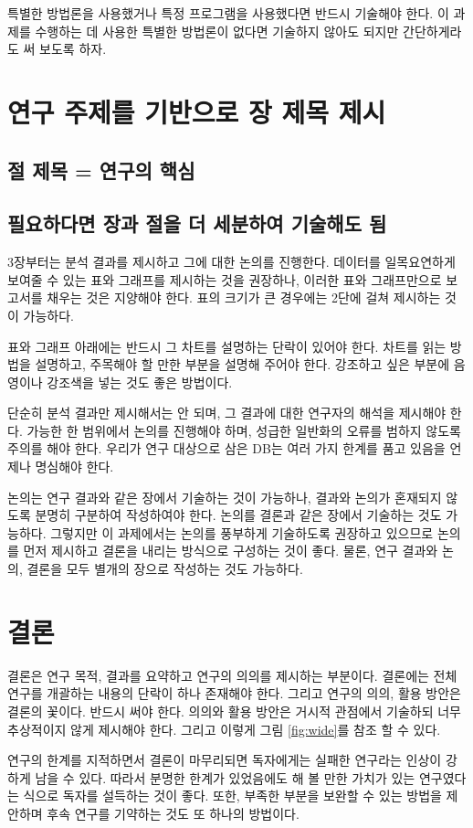 특별한 방법론을 사용했거나 특정 프로그램을 사용했다면 반드시 기술해야 한다. 이 과제를 수행하는 데 사용한 특별한 방법론이 없다면 기술하지 않아도 되지만 간단하게라도 써 보도록 하자.

\section{연구 주제를 기반으로 장 제목 제시}

\subsection{절 제목 = 연구의 핵심}

\subsection{필요하다면 장과 절을 더 세분하여 기술해도 됨}

3장부터는 분석 결과를 제시하고 그에 대한 논의를 진행한다. 데이터를 일목요연하게 보여줄 수 있는 표와 그래프를 제시하는 것을 권장하나, 이러한 표와 그래프만으로 보고서를 채우는 것은 지양해야 한다. 표의 크기가 큰 경우에는 2단에 걸쳐 제시하는 것이 가능하다. 

표와 그래프 아래에는 반드시 그 차트를 설명하는 단락이 있어야 한다. 차트를 읽는 방법을 설명하고, 주목해야 할 만한 부분을 설명해 주어야 한다. 강조하고 싶은 부분에 음영이나 강조색을 넣는 것도 좋은 방법이다.

단순히 분석 결과만 제시해서는 안 되며, 그 결과에 대한 연구자의 해석을 제시해야 한다. 가능한 한 범위에서 논의를 진행해야 하며, 성급한 일반화의 오류를 범하지 않도록 주의를 해야 한다. 우리가 연구 대상으로 삼은 DB는 여러 가지 한계를 품고 있음을 언제나 명심해야 한다.

논의는 연구 결과와 같은 장에서 기술하는 것이 가능하나, 결과와 논의가 혼재되지 않도록 분명히 구분하여 작성하여야 한다. 논의를 결론과 같은 장에서 기술하는 것도 가능하다. 그렇지만 이 과제에서는 논의를 풍부하게 기술하도록 권장하고 있으므로 논의를 먼저 제시하고 결론을 내리는 방식으로 구성하는 것이 좋다. 물론, 연구 결과와 논의, 결론을 모두 별개의 장으로 작성하는 것도 가능하다.

\section{결론}

결론은 연구 목적, 결과를 요약하고 연구의 의의를 제시하는 부분이다. 결론에는 전체 연구를 개괄하는 내용의 단락이 하나 존재해야 한다. 그리고 연구의 의의, 활용 방안은 결론의 꽃이다. 반드시 써야 한다. 의의와 활용 방안은 거시적 관점에서 기술하되 너무 추상적이지 않게 제시해야 한다. 그리고 이렇게 그림 \ref{fig:wide}를 참조 할 수 있다.

연구의 한계를 지적하면서 결론이 마무리되면 독자에게는 실패한 연구라는 인상이 강하게 남을 수 있다. 따라서 분명한 한계가 있었음에도 해 볼 만한 가치가 있는 연구였다는 식으로 독자를 설득하는 것이 좋다. 또한, 부족한 부분을 보완할 수 있는 방법을 제안하며 후속 연구를 기약하는 것도 또 하나의 방법이다.